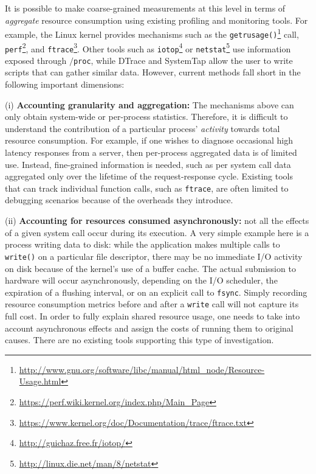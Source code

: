 \documentclass[12pt,twoside,a4paper]{article}
\begin{document}
It is possible to make coarse-grained measurements at this level in terms of
\textit{aggregate} resource consumption using existing profiling and monitoring
tools. For example, the Linux kernel provides mechanisms such as the
\texttt{getrusage()}\footnote{\url{http://www.gnu.org/software/libc/manual/html_node/Resource-Usage.html}} call, \texttt{perf}\footnote{\url{https://perf.wiki.kernel.org/index.php/Main_Page}}, and \texttt{ftrace}\footnote{\url{https://www.kernel.org/doc/Documentation/trace/ftrace.txt}}. Other tools such
as \texttt{iotop}\footnote{\url{http://guichaz.free.fr/iotop/}} or \texttt{netstat}\footnote{\url{http://linux.die.net/man/8/netstat}} use information exposed through
\texttt{$/$proc}, while DTrace \cite{dtrace} and SystemTap \cite{systap} allow the user to write scripts that can gather
similar data. However, current methods fall short in the following important
dimensions:

(i) \textbf{Accounting granularity and aggregation:} The mechanisms
above can only obtain system-wide or per-process statistics. Therefore, it is
difficult to understand the contribution of a particular process'
\textit{activity} towards total resource consumption. For example, if one
wishes to diagnose occasional high latency responses from a server, then
per-process aggregated data is of limited use. Instead, fine-grained information is
needed, such as per system call data aggregated only over the lifetime of the
request-response cycle. Existing tools that can track individual function calls,
such as \texttt{ftrace}, are often limited to debugging scenarios because of the overheads
they introduce.

(ii) \textbf{Accounting for resources consumed asynchronously:} not all the
effects of a given system call occur during its execution. A very simple example
here is a process writing data to disk: while the application makes multiple
calls to \texttt{write()} on a particular file descriptor, there may be no
immediate I/O activity on disk because of the kernel's use of a buffer cache.
The actual submission to hardware will occur asynchronously, depending on the
I/O scheduler, the expiration of a flushing interval, or on an explicit call to
\texttt{fsync}. Simply recording resource consumption metrics before and after a
\texttt{write} call will not capture its full cost. In order to fully explain
shared resource usage, one needs to take into account asynchronous effects and
assign the costs of running them to original causes. There are no existing tools
supporting this type of investigation.
\end{document}
